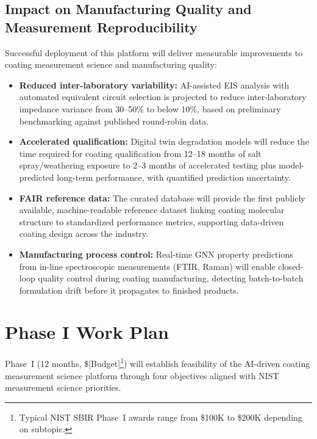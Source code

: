 \documentclass[11pt,letterpaper]{article}
\begin{document}
\subsection{Impact on Manufacturing Quality and Measurement Reproducibility}

Successful deployment of this platform will deliver measurable improvements to coating measurement science and manufacturing quality:

\begin{itemize}[leftmargin=*]
  \item \textbf{Reduced inter-laboratory variability:} AI-assisted EIS analysis with automated equivalent circuit selection is projected to reduce inter-laboratory impedance variance from 30--50\% to below 10\%, based on preliminary benchmarking against published round-robin data.

  \item \textbf{Accelerated qualification:} Digital twin degradation models will reduce the time required for coating qualification from 12--18 months of salt spray/weathering exposure to 2--3 months of accelerated testing plus model-predicted long-term performance, with quantified prediction uncertainty.

  \item \textbf{FAIR reference data:} The curated database will provide the first publicly available, machine-readable reference dataset linking coating molecular structure to standardized performance metrics, supporting data-driven coating design across the industry.

  \item \textbf{Manufacturing process control:} Real-time GNN property predictions from in-line spectroscopic measurements (FTIR, Raman) will enable closed-loop quality control during coating manufacturing, detecting batch-to-batch formulation drift before it propagates to finished products.
\end{itemize}

\section{Phase I Work Plan}
\label{sec:workplan}

Phase~I (12 months, \$[Budget]\footnote{Typical NIST SBIR Phase~I awards range from \$100K to \$200K depending on subtopic.}) will establish feasibility of the AI-driven coating measurement science platform through four objectives aligned with NIST measurement science priorities.
\end{document}
